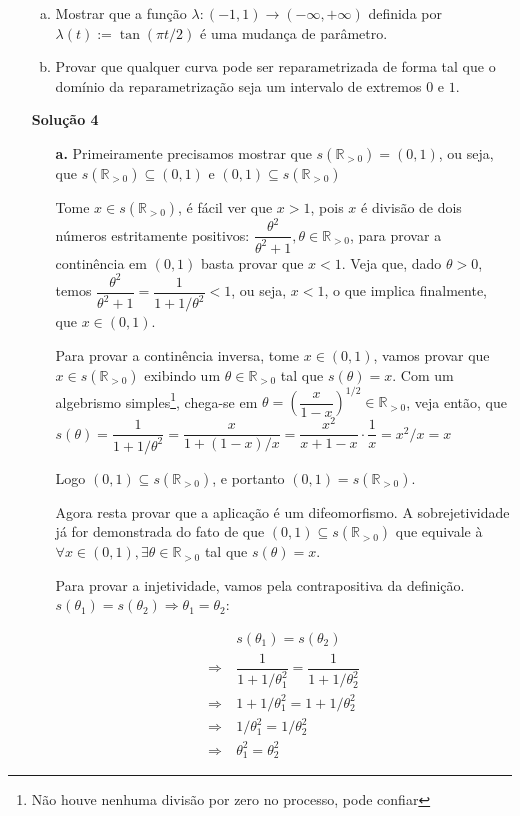 \documentclass[12pt,letterpaper]{article}
\newcommand{\rpos}{\mathbb{R}_{>0}}
\newcommand{\sol}[1]{\textbf{Solução #1}}
\begin{document}
\begin{enumerate}
\begin{enumerate}[a.]
			
			
			\item Mostrar que a função $\lambda:(-1,1)\to(-\infty,+\infty)$ definida por $\lambda(t):=\tan(\pi t/2)$ é uma mudança de parâmetro.
			
			\item Provar que qualquer curva pode ser reparametrizada de forma tal que o domínio da reparametrização seja um intervalo de extremos $0$ e $1$.
		\end{enumerate}
	
	\item [\sol{4}] 
	\begin{enumerate}
		\item [\textbf{a.}]Primeiramente precisamos mostrar que $s(\rpos)=(0,1)$, ou seja, que $s(\rpos)\subseteq (0,1)$ e $(0,1)\subseteq s(\rpos)$
		
		Tome $x\in s(\rpos)$, é fácil ver que $x>1$, pois $x$ é divisão de dois números estritamente positivos: $\dfrac{\theta^2}{\theta^2+1},\theta\in\rpos$, para provar a continência em $(0,1)$ basta provar que $x<1$. Veja que, dado $\theta>0$, temos $\dfrac{\theta^2}{\theta^2+1}=\dfrac{1}{1+1/\theta^2}<1$, ou seja, $x<1$, o que implica finalmente, que $x\in(0,1)$.
		
		Para provar a continência inversa, tome $x\in(0,1)$, vamos provar que $x\in s(\rpos)$ exibindo um $\theta\in\rpos$ tal que $s(\theta)=x$. Com um algebrismo simples\footnote{Não houve nenhuma divisão por zero no processo, pode confiar}, chega-se em $\theta=\left(\dfrac{x}{1-x}\right)^{1/2}\in\rpos$, veja então, que $s(\theta)=\dfrac{1}{1+1/\theta^2}=\dfrac{x}{1+(1-x)/x}=\dfrac{x^2}{x+1-x}\cdot\dfrac1x=x^2/x=x$
		
		Logo $(0,1)\subseteq s(\rpos)$, e portanto $(0,1)= s(\rpos)$.
		
		Agora resta provar que a aplicação é um difeomorfismo. A sobrejetividade já for demonstrada do fato de que $(0,1)\subseteq s(\rpos)$ que equivale à $\forall x\in(0,1),\exists \theta\in\rpos$ tal que $s(\theta)=x$.
		
		Para provar a injetividade, vamos pela contrapositiva da definição. $s(\theta_1)=s(\theta_2)\Rightarrow\theta_1=\theta_2$:
		
		\begin{align*}
			&~s(\theta_1)=s(\theta_2)\\
			\Rightarrow&~\dfrac{1}{1+1/\theta_1^2}=\dfrac{1}{1+1/\theta_2^2}\\
			\Rightarrow&~1+1/\theta_1^2=1+1/\theta_2^2\\
			\Rightarrow&~1/\theta_1^2=1/\theta_2^2\\
			\Rightarrow&~\theta_1^2=\theta_2^2
		\end{align*}
	

\end{enumerate}
\end{enumerate}
\end{document}
